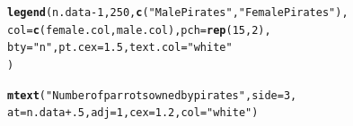 \documentclass{tufte-book}\usepackage[]{graphicx}\usepackage[]{color}
\makeatletter
\newcommand{\hlnum}[1]{\textcolor[rgb]{0.686,0.059,0.569}{#1}}%
\newcommand{\hlstr}[1]{\textcolor[rgb]{0.192,0.494,0.8}{#1}}%
\newcommand{\hlopt}[1]{\textcolor[rgb]{0,0,0}{#1}}%
\newcommand{\hlstd}[1]{\textcolor[rgb]{0.345,0.345,0.345}{#1}}%
\newcommand{\hlkwc}[1]{\textcolor[rgb]{0.333,0.667,0.333}{#1}}%
\newcommand{\hlkwd}[1]{\textcolor[rgb]{0.737,0.353,0.396}{\textbf{#1}}}%
\newenvironment{kframe}{%
 \def\at@end@of@kframe{}%
 \ifinner\ifhmode%
  \def\at@end@of@kframe{\end{minipage}}%
  \begin{minipage}{\columnwidth}%
 \fi\fi%
 \def\FrameCommand##1{\hskip\@totalleftmargin \hskip-\fboxsep
 \colorbox{shadecolor}{##1}\hskip-\fboxsep
     \hskip-\linewidth \hskip-\@totalleftmargin \hskip\columnwidth}%
 \MakeFramed {\advance\hsize-\width
   \@totalleftmargin\z@ \linewidth\hsize
   \@setminipage}}%
 {\par\unskip\endMakeFramed%
 \at@end@of@kframe}
\newenvironment{knitrout}{}{} %
\makeatother
\begin{document}
\begin{itemize}
\begin{marginfigure}
\begin{tiny}
\begin{knitrout}
\begin{kframe}
\begin{alltt}
\hlkwd{legend}\hlstd{(n.data} \hlopt{-} \hlnum{1}\hlstd{,} \hlnum{250}\hlstd{,} \hlkwd{c}\hlstd{(}\hlstr{"Male Pirates"}\hlstd{,} \hlstr{"Female Pirates"}\hlstd{),}
       \hlkwc{col} \hlstd{=} \hlkwd{c}\hlstd{(female.col, male.col),} \hlkwc{pch} \hlstd{=} \hlkwd{rep}\hlstd{(}\hlnum{15}\hlstd{,} \hlnum{2}\hlstd{),}
       \hlkwc{bty} \hlstd{=} \hlstr{"n"}\hlstd{,} \hlkwc{pt.cex} \hlstd{=} \hlnum{1.5}\hlstd{,} \hlkwc{text.col} \hlstd{=} \hlstr{"white"}
       \hlstd{)}

\hlkwd{mtext}\hlstd{(}\hlstr{"Number of parrots owned by pirates"}\hlstd{,} \hlkwc{side} \hlstd{=} \hlnum{3}\hlstd{,}
      \hlkwc{at} \hlstd{= n.data} \hlopt{+} \hlnum{.5}\hlstd{,} \hlkwc{adj} \hlstd{=} \hlnum{1}\hlstd{,} \hlkwc{cex} \hlstd{=} \hlnum{1.2}\hlstd{,} \hlkwc{col} \hlstd{=} \hlstr{"white"}\hlstd{)}


\end{alltt}
\end{kframe}
\end{knitrout}
\end{tiny}
\end{marginfigure}
\end{itemize}
\end{document}
